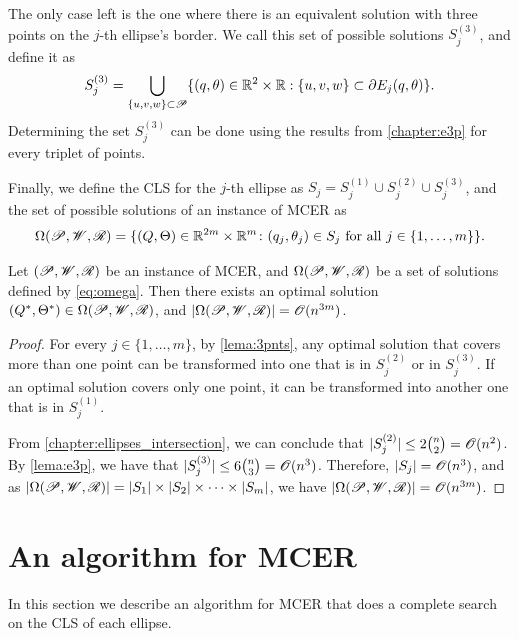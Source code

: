 The only case left is the one where there is an equivalent solution with three points on the $j$-th ellipse's border. We call this set of possible solutions $S_j^{(3)}$, and define it as
\begin{equation}
	S_j^{(3)} = \bigcup_{\{u, v, w\} \subset \mathscr{P}} \{(q, \theta)\in \mathbb{R}^2\times\mathbb{R}: \{u, v, w\} \subset \partial E_j(q, \theta)\}.
\end{equation}
Determining the set $S_j^{(3)}$ can be done using the results from \autoref{chapter:e3p} for every triplet of points.

Finally, we define the CLS for the $j$-th ellipse as $S_j = S_j^{(1)} \cup S_j^{(2)} \cup S_j^{(3)}$, and the set of possible solutions of an instance of MCER as
\begin{equation}\label{eq:omega}
\Omega(\mathscr{P}, \mathscr{W}, \mathscr{R}) = \{(Q, \Theta)\in \mathbb{R}^{2m}\times\mathbb{R}^m \colon (q_j, \theta_j) \in S_j \textnormal{ for all } j\in\{1, \dots, m\}\}.
\end{equation}

\begin{theorem}\label{th:mcer}
	Let $(\mathscr{P}, \mathscr{W}, \mathscr{R})$ be an instance of MCER, and $\Omega(\mathscr{P}, \mathscr{W}, \mathscr{R})$ be a set of solutions defined by \autoref{eq:omega}. Then there exists an optimal solution $(Q^*, \Theta^*) \in \Omega(\mathscr{P}, \mathscr{W}, \mathscr{R})$, and $|\Omega(\mathscr{P}, \mathscr{W}, \mathscr{R})|=\mathscr{O}(n^{3m})$.	
\end{theorem}

\begin{proof}
	For every $j \in \{1, \dots, m\}$, by \autoref{lema:3pnts}, any optimal solution that covers more than one point can be transformed into one that is in $S_j^{(2)}$ or in $S_j^{(3)}$.
	If an optimal solution covers only one point, it can be transformed into another one that is in $S_j^{(1)}$.
	
	From \autoref{chapter:ellipses_intersection}, we can conclude that $|S_j^{(2)}|\le 2\binom{n}{2} = \mathscr{O}(n^2)$.
	By \autoref{lema:e3p}, we have that $|S_j^{(3)}| \le 6\binom{n}{3} = \mathscr{O}(n^3)$.
	Therefore, $|S_j|=\mathscr{O}(n^3)$, and as $|\Omega(\mathscr{P}, \mathscr{W}, \mathscr{R})|= |S_1|\times|S_2|\times\dots\times|S_m|$, we have $|\Omega(\mathscr{P}, \mathscr{W}, \mathscr{R})|=\mathscr{O}(n^{3m})$.
\end{proof}

\section{An algorithm for MCER}

In this section we describe an algorithm for MCER that does a complete search on the CLS of each ellipse.

